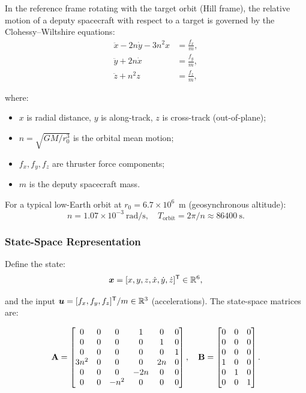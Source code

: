 In the reference frame rotating with the target orbit (Hill frame), the relative motion
of a deputy spacecraft with respect to a target is governed by the Clohessy--Wiltshire equations:
\begin{align}
\ddot{x} - 2n\dot{y} - 3n^2 x &= \frac{f_x}{m}, \label{eq:ch8:cw-x} \\
\ddot{y} + 2n\dot{x} &= \frac{f_y}{m}, \label{eq:ch8:cw-y} \\
\ddot{z} + n^2 z &= \frac{f_z}{m}, \label{eq:ch8:cw-z}
\end{align}

where:
\begin{itemize}
\item $x$ is radial distance, $y$ is along-track, $z$ is cross-track (out-of-plane);
\item $n = \sqrt{GM/r_0^3}$ is the orbital mean motion;
\item $f_x, f_y, f_z$ are thruster force components;
\item $m$ is the deputy spacecraft mass.
\end{itemize}

For a typical low-Earth orbit at $r_0 = 6.7 \times 10^6$~m (geosynchronous altitude):
\begin{equation}
n = 1.07 \times 10^{-3}~\text{rad/s}, \quad T_{\text{orbit}} = 2\pi/n \approx 86400~\text{s}.
\end{equation}

\subsubsection{State-Space Representation}

Define the state:
\begin{equation}
\bm{x} = [x, y, z, \dot{x}, \dot{y}, \dot{z}]^{\mathsf{T}} \in \mathbb{R}^6,
\label{eq:ch8:spacecraft-state}
\end{equation}

and the input $\bm{u} = [f_x, f_y, f_z]^{\mathsf{T}} / m \in \mathbb{R}^3$ (accelerations). The state-space
matrices are:

\begin{equation}
\mathbf{A} = \begin{bmatrix}
0 & 0 & 0 & 1 & 0 & 0 \\
0 & 0 & 0 & 0 & 1 & 0 \\
0 & 0 & 0 & 0 & 0 & 1 \\
3n^2 & 0 & 0 & 0 & 2n & 0 \\
0 & 0 & 0 & -2n & 0 & 0 \\
0 & 0 & -n^2 & 0 & 0 & 0
\end{bmatrix}, \quad
\mathbf{B} = \begin{bmatrix}
0 & 0 & 0 \\
0 & 0 & 0 \\
0 & 0 & 0 \\
1 & 0 & 0 \\
0 & 1 & 0 \\
0 & 0 & 1
\end{bmatrix}.
\label{eq:ch8:A-B-spacecraft}
\end{equation}

